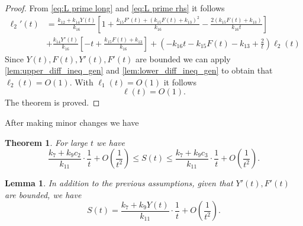 \documentclass[pdflatex,sn-mathphys-num]{sn-jnl}
\theoremstyle{thmstyleone}
\newtheorem{theorem}{Theorem}[section]
\newtheorem{lemma}{Lemma}[section]
\theoremstyle{thmstyletwo}
\theoremstyle{thmstylethree}
\begin{document}
\begin{proof}
From \eqref{eq:L prime long} and \eqref{eq:L prime rhs} it follows 
\begin{align} 
\ell_2'(t) &= \frac{k_{12}+k_{14}Y(t)}{k_{16}} 
\left[ 1 + \frac{k_{15}F'(t) + (k_{15}F(t)+k_{13})^2}{k_{16}} 
- \frac{2(k_{15}F(t)+k_{13})}{k_{16}t} \right] \nonumber \\ 
& + \frac{k_{14}Y'(t)}{k_{16}} \left[ -t + \frac{k_{15}F(t)+k_{13}}{k_{16}} \right] 
 + \left( -k_{16}t - k_{15}F(t) - k_{13} + \frac{2}{t} \right) \ell_2(t) 
\end{align}
Since $Y(t),F(t),Y'(t),F'(t)$ are bounded we can apply \autoref{lem:upper_diff_ineq_gen} 
and \autoref{lem:lower_diff_ineq_gen} to obtain that $\ell_2(t)=O(1)$. With $\ell_1(t)=O(1)$ 
it follows 
\begin{equation*}
\ell(t)=O(1). 
\end{equation*}
The theorem is proved. 
\end{proof}

After making minor changes we have
\begin{theorem}\label{thm:S_t_estimation}
For large $t$ we have 
\begin{equation*}
\frac{k_{7}+k_{9}c_2}{k_{11}}\cdot\frac{1}{t}+O\left(\frac{1}{t^2} \right)\leq 
S(t)\leq \frac{k_{7}+k_{9}c_3}{k_{11}}\cdot\frac{1}{t}+O\left(\frac{1}{t^2} \right).
\end{equation*}
\end{theorem}

\begin{lemma}
In addition to the previous assumptions, given that $Y'(t), F'(t)$ are bounded, 
we have 
\begin{equation*} 
    S(t)=\frac{k_{7}+k_{9}Y(t)}{k_{11}}\cdot\frac{1}{t}+O\left( \frac{1}{t^2} \right).
\end{equation*}
\end{lemma}
\end{document}
